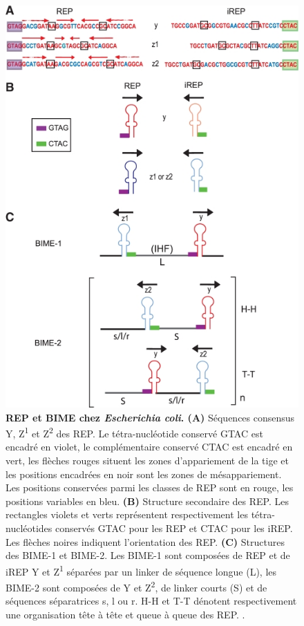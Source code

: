\documentclass[12pt,a4paper]{report}
\begin{document}
\begin{onehalfspace}
\begin{figure}[ht]
\centerline{\includegraphics[scale=1.8]{figures/rep_bime.jpg}}
\caption{\textbf{REP et BIME chez \textit{Escherichia coli}. (A)} Séquences consensus Y, Z\textsuperscript{1} et Z\textsuperscript{2} des REP. Le tétra-nucléotide conservé GTAC est encadré en violet, le complémentaire conservé CTAC est encadré en vert, les flèches rouges situent les zones d'appariement de la tige et les positions encadrées en noir sont les zones de mésappariement. Les positions conservées parmi les classes de REP sont en rouge, les positions variables en bleu. \textbf{(B)} Structure secondaire des REP. Les rectangles violets et verts représentent respectivement les tétra-nucléotides conservés GTAC pour les REP et CTAC pour les iREP. Les flèches noires indiquent l'orientation des REP. \textbf{(C)} Structures des BIME-1 et BIME-2. Les BIME-1 sont composées de REP et de iREP Y et Z\textsuperscript{1} séparées par un linker de séquence longue (L), les BIME-2 sont composées de Y et Z\textsuperscript{2}, de linker courts (S) et de séquences séparatrices s, l ou r. H-H et T-T dénotent respectivement une organisation tête à tête et queue à queue des REP. \citep{Ton-Hoang2012}.}
\label{fig:rep_bime} 
\end{figure}


\end{onehalfspace}
\end{document}
